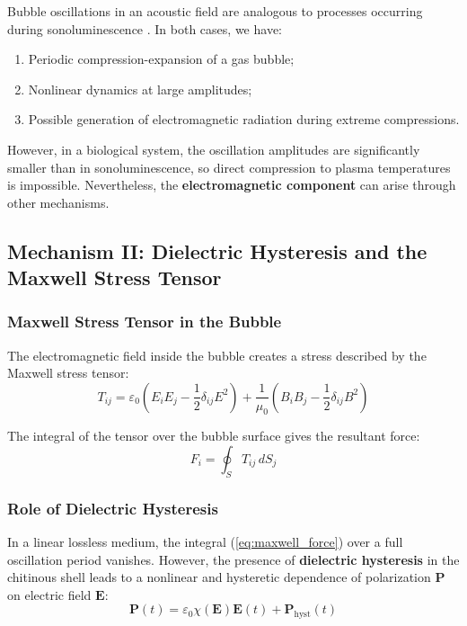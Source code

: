 \documentclass[12pt,a4paper]{article}
\begin{document}
Bubble oscillations in an acoustic field are analogous to processes occurring during sonoluminescence \cite{sonoluminescence}. In both cases, we have:
\begin{enumerate}
    \item Periodic compression-expansion of a gas bubble;
    \item Nonlinear dynamics at large amplitudes;
    \item Possible generation of electromagnetic radiation during extreme compressions.
\end{enumerate}

However, in a biological system, the oscillation amplitudes are significantly smaller than in sonoluminescence, so direct compression to plasma temperatures is impossible. Nevertheless, the \textbf{electromagnetic component} can arise through other mechanisms.

\subsection{Mechanism II: Dielectric Hysteresis and the Maxwell Stress Tensor}

\subsubsection{Maxwell Stress Tensor in the Bubble}

The electromagnetic field inside the bubble creates a stress described by the Maxwell stress tensor:
\begin{equation}
    T_{ij} = \varepsilon_0 \left( E_i E_j - \frac{1}{2} \delta_{ij} E^2 \right) + \frac{1}{\mu_0} \left( B_i B_j - \frac{1}{2} \delta_{ij} B^2 \right)
    \label{eq:maxwell_tensor}
\end{equation}

The integral of the tensor over the bubble surface gives the resultant force:
\begin{equation}
    F_i = \oint_S T_{ij} \, dS_j
    \label{eq:maxwell_force}
\end{equation}

\subsubsection{Role of Dielectric Hysteresis}

In a linear lossless medium, the integral (\ref{eq:maxwell_force}) over a full oscillation period vanishes. However, the presence of \textbf{dielectric hysteresis} in the chitinous shell leads to a nonlinear and hysteretic dependence of polarization $\bm{P}$ on electric field $\bm{E}$:
\begin{equation}
    \bm{P}(t) = \varepsilon_0 \chi(\bm{E}) \bm{E}(t) + \bm{P}_{\text{hyst}}(t)
    \label{eq:hysteresis}
\end{equation}
\end{document}
